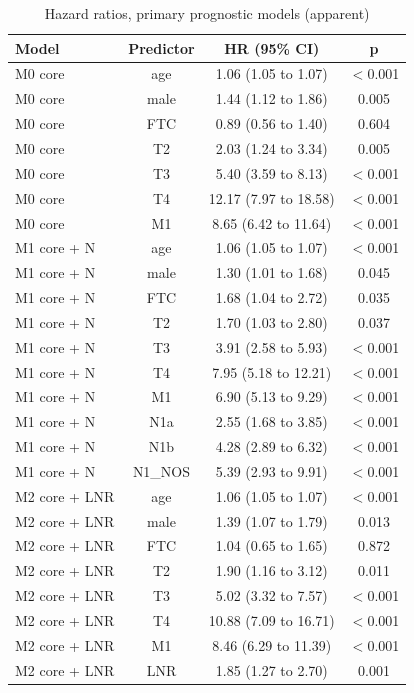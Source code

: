 \begin{table}[htbp]
\caption{Hazard ratios, primary prognostic models (apparent)}\label{tab:s6_hazard_ratios}
\scriptsize
\begin{tabular*}{\textwidth}{@{\extracolsep{\fill}}lccc@{}}
\toprule
Model & Predictor & HR (95\% CI) & p \\
\midrule
M0 core & age & 1.06 (1.05 to 1.07) & $<$0.001 \\
M0 core & male & 1.44 (1.12 to 1.86) & 0.005 \\
M0 core & FTC & 0.89 (0.56 to 1.40) & 0.604 \\
M0 core & T2 & 2.03 (1.24 to 3.34) & 0.005 \\
M0 core & T3 & 5.40 (3.59 to 8.13) & $<$0.001 \\
M0 core & T4 & 12.17 (7.97 to 18.58) & $<$0.001 \\
M0 core & M1 & 8.65 (6.42 to 11.64) & $<$0.001 \\
M1 core + N & age & 1.06 (1.05 to 1.07) & $<$0.001 \\
M1 core + N & male & 1.30 (1.01 to 1.68) & 0.045 \\
M1 core + N & FTC & 1.68 (1.04 to 2.72) & 0.035 \\
M1 core + N & T2 & 1.70 (1.03 to 2.80) & 0.037 \\
M1 core + N & T3 & 3.91 (2.58 to 5.93) & $<$0.001 \\
M1 core + N & T4 & 7.95 (5.18 to 12.21) & $<$0.001 \\
M1 core + N & M1 & 6.90 (5.13 to 9.29) & $<$0.001 \\
M1 core + N & N1a & 2.55 (1.68 to 3.85) & $<$0.001 \\
M1 core + N & N1b & 4.28 (2.89 to 6.32) & $<$0.001 \\
M1 core + N & N1\_NOS & 5.39 (2.93 to 9.91) & $<$0.001 \\
M2 core + LNR & age & 1.06 (1.05 to 1.07) & $<$0.001 \\
M2 core + LNR & male & 1.39 (1.07 to 1.79) & 0.013 \\
M2 core + LNR & FTC & 1.04 (0.65 to 1.65) & 0.872 \\
M2 core + LNR & T2 & 1.90 (1.16 to 3.12) & 0.011 \\
M2 core + LNR & T3 & 5.02 (3.32 to 7.57) & $<$0.001 \\
M2 core + LNR & T4 & 10.88 (7.09 to 16.71) & $<$0.001 \\
M2 core + LNR & M1 & 8.46 (6.29 to 11.39) & $<$0.001 \\
M2 core + LNR & LNR & 1.85 (1.27 to 2.70) & 0.001 \\

\end{tabular*}
\end{table}
